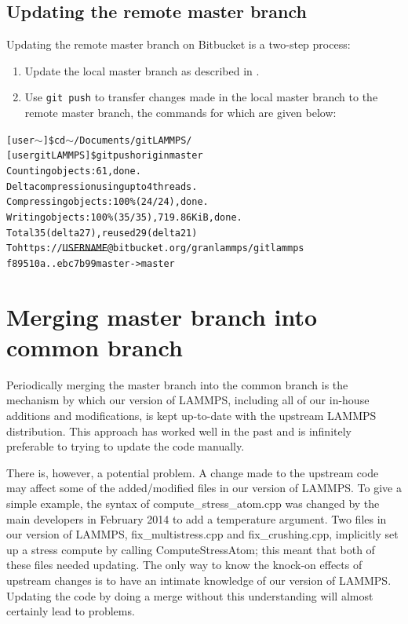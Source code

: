 \documentclass[a4paper,oneside,11pt]{article}
\begin{document}
\subsection{Updating the remote master branch}\label{ssec:urmb}
Updating the remote master branch on Bitbucket is a two-step process:
\begin{enumerate}
  \item Update the local master branch as described in .
  \item Use \texttt{git push} to transfer changes made in the local master branch to the remote master branch, the commands for which are given below:
\end{enumerate}
\begin{alltt}
[user \(\sim\)]\$ cd \(\sim\)/Documents/gitLAMMPS/
[user gitLAMMPS]\$ git push origin master
Counting objects: 61, done.
Delta compression using up to 4 threads.
Compressing objects: 100\% (24/24), done.
Writing objects: 100\% (35/35), 719.86 KiB, done.
Total 35 (delta 27), reused 29 (delta 21)
To https://\sout{USERNAME}@bitbucket.org/granlammps/gitlammps
   f89510a..ebc7b99  master -> master
\end{alltt}

\section{Merging master branch into common branch}
Periodically merging the master branch into the common branch is the mechanism by which our version of LAMMPS, including all of our in-house additions and modifications, is kept up-to-date with the upstream LAMMPS distribution. This approach has worked well in the past and is infinitely preferable to trying to update the code manually. 

There is, however, a potential problem. A change made to the upstream code may affect some of the added\slash modified files in our version of LAMMPS. To give a simple example, the syntax of compute\_stress\_atom.cpp was changed by the main developers in February 2014 to add a temperature argument. Two files in our version of LAMMPS, fix\_multistress.cpp and fix\_crushing.cpp, implicitly set up a stress compute by calling ComputeStressAtom; this meant that both of these files needed updating. The only way to know the knock-on effects of upstream changes is to have an intimate knowledge of our version of LAMMPS. Updating the code by doing a merge without this understanding will almost certainly lead to problems.
\end{document}
